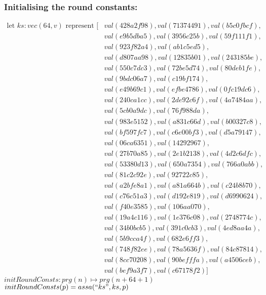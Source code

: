 \documentclass[11pt]{article}
\begin{document}
  \subsubsection{Initialising the round constants:}
  \begin{align*}
  \text{let $ks : vec(64,v)$ represent }
          [&val(428a2f98),val(71374491),val(b5c0fbcf), \\
           &val(e9b5dba5),val(3956c25b),val(59f111f1), \\
           &val(923f82a4),val(ab1c5ed5), \\
           &val(d807aa98),val(12835b01),val(243185be), \\
           &val(550c7dc3),val(72be5d74),val(80deb1fe), \\
           &val(9bdc06a7),val(c19bf174), \\
           &val(e49b69c1),val(efbe4786),val(0fc19dc6), \\
           &val(240ca1cc),val(2de92c6f),val(4a7484aa), \\
           &val(5cb0a9dc),val(76f988da), \\
           &val(983e5152),val(a831c66d),val(b00327c8), \\
           &val(bf597fc7),val(c6e00bf3),val(d5a79147), \\
           &val(06ca6351),val(14292967), \\
           &val(27b70a85),val(2e1b2138),val(4d2c6dfc), \\
           &val(53380d13),val(650a7354),val(766a0abb), \\
           &val(81c2c92e),val(92722c85), \\
           &val(a2bfe8a1),val(a81a664b),val(c24b8b70), \\
           &val(c76c51a3),val(d192e819),val(d6990624), \\
           &val(f40e3585),val(106aa070), \\
           &val(19a4c116),val(1e376c08),val(2748774c), \\
           &val(34b0bcb5),val(391c0cb3),val(4ed8aa4a), \\
           &val(5b9cca4f),val(682e6ff3), \\
           &val(748f82ee),val(78a5636f),val(84c87814), \\
           &val(8cc70208),val(90befffa),val(a4506ceb), \\
           &val(bef9a3f7),val(c67178f2)]
  \end{align*}
  $initRoundConsts : prg(n) \mapsto prg (n + 64 + 1)$ \\
  $initRoundConsts(p) = assa(``ks",ks,p)$
\end{document}
